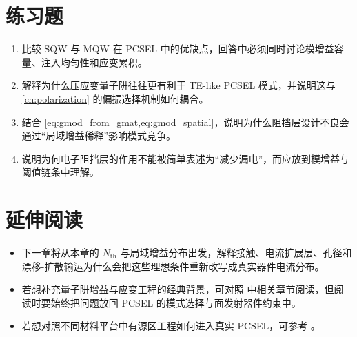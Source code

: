 \section*{练习题}
\begin{enumerate}
  \item \basicq 比较 SQW 与 MQW 在 PCSEL 中的优缺点，回答中必须同时讨论模增益容量、注入均匀性和应变累积。

  \item \basicq 解释为什么压应变量子阱往往更有利于 TE-like PCSEL 模式，并说明这与 \cref{ch:polarization} 的偏振选择机制如何耦合。

  \item \midq 结合 \cref{eq:gmod_from_gmat,eq:gmod_spatial}，说明为什么阻挡层设计不良会通过“局域增益稀释”影响模式竞争。

  \item \hardq 说明为何电子阻挡层的作用不能被简单表述为“减少漏电”，而应放到模增益与阈值链条中理解。
\end{enumerate}

\section*{延伸阅读}
\begin{itemize}
  \item 下一章将从本章的 $N_{\mathrm{th}}$ 与局域增益分布出发，解释接触、电流扩展层、孔径和漂移-扩散输运为什么会把这些理想条件重新改写成真实器件电流分布。

  \item 若想补充量子阱增益与应变工程的经典背景，可对照 \cite{coldren2012} 中相关章节阅读，但阅读时要始终把问题放回 PCSEL 的模式选择与面发射器件约束中。

  \item 若想对照不同材料平台中有源区工程如何进入真实 PCSEL，可参考 \cite{matsubara2008,yoshida2023,zhoupan2023}。
\end{itemize}
